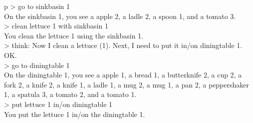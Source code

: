 \begin{table}[H]
\begin{minipage}{0.9\linewidth}
\begin{tabular}{p\linewidth}
> go to sinkbasin 1\\
On the sinkbasin 1, you see a apple 2, a ladle 2, a spoon 1, and a tomato 3.\\
> clean lettuce 1 with sinkbasin 1\\
You clean the lettuce 1 using the sinkbasin 1.\\
> think: Now I clean a lettuce (1). Next, I need to put it in/on diningtable 1.\\
OK.\\
> go to diningtable 1\\
On the diningtable 1, you see a apple 1, a bread 1, a butterknife 2, a cup 2, a fork 2, a knife 2, a knife 1, a ladle 1, a mug 2, a mug 1, a pan 2, a peppershaker 1, a spatula 3, a tomato 2, and a tomato 1.\\
> put lettuce 1 in/on diningtable 1\\
You put the lettuce 1 in/on the diningtable 1.\\



\midrule \\

\end{tabular}
\end{minipage}%
\end{table}


